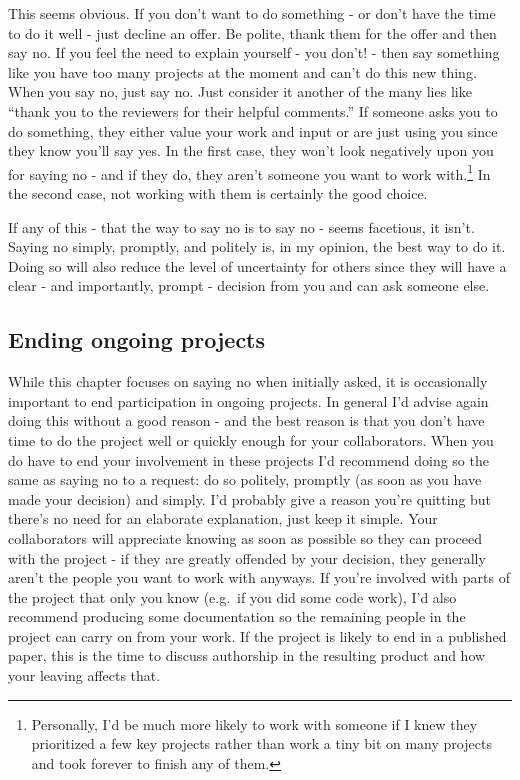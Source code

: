 \documentclass[
  12pt,
]{book}
\begin{document}
This seems obvious. If you don't want to do something - or don't have the time to do it well - just decline an offer. Be polite, thank them for the offer and then say no. If you feel the need to explain yourself - you don't! - then say something like you have too many projects at the moment and can't do this new thing. When you say no, just say no. Just consider it another of the many lies like ``thank you to the reviewers for their helpful comments.'' If someone asks you to do something, they either value your work and input or are just using you since they know you'll say yes. In the first case, they won't look negatively upon you for saying no - and if they do, they aren't someone you want to work with.\footnote{Personally, I'd be much more likely to work with someone if I knew they prioritized a few key projects rather than work a tiny bit on many projects and took forever to finish any of them.} In the second case, not working with them is certainly the good choice.

If any of this - that the way to say no is to say no - seems facetious, it isn't. Saying no simply, promptly, and politely is, in my opinion, the best way to do it. Doing so will also reduce the level of uncertainty for others since they will have a clear - and importantly, prompt - decision from you and can ask someone else.

\hypertarget{ending-ongoing-projects}{%
\subsection{Ending ongoing projects}\label{ending-ongoing-projects}}

While this chapter focuses on saying no when initially asked, it is occasionally important to end participation in ongoing projects. In general I'd advise again doing this without a good reason - and the best reason is that you don't have time to do the project well or quickly enough for your collaborators. When you do have to end your involvement in these projects I'd recommend doing so the same as saying no to a request: do so politely, promptly (as soon as you have made your decision) and simply. I'd probably give a reason you're quitting but there's no need for an elaborate explanation, just keep it simple. Your collaborators will appreciate knowing as soon as possible so they can proceed with the project - if they are greatly offended by your decision, they generally aren't the people you want to work with anyways. If you're involved with parts of the project that only you know (e.g.~if you did some code work), I'd also recommend producing some documentation so the remaining people in the project can carry on from your work. If the project is likely to end in a published paper, this is the time to discuss authorship in the resulting product and how your leaving affects that.
\end{document}
